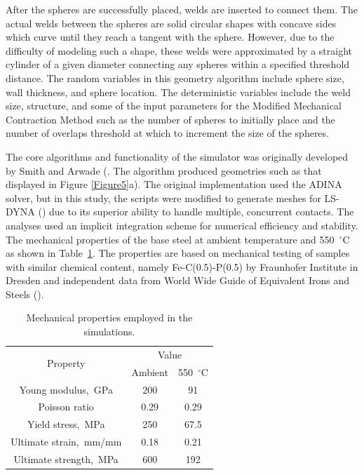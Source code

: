 \documentclass[review]{elsarticle}
\begin{document}
After the spheres are successfully placed, welds are inserted to connect them. The actual welds between the spheres are solid circular shapes with concave sides which curve until they reach a tangent with the sphere. However, due to the difficulty of modeling such a shape, these welds were approximated by a straight cylinder of a given diameter connecting any spheres within a specified threshold distance. The random variables in this geometry algorithm include sphere size, wall thickness, and sphere location. The deterministic variables include the weld size, structure, and some of the input parameters for the Modified Mechanical Contraction Method such as the number of spheres to initially place and the number of overlaps threshold at which to increment the size of the spheres.

The core algorithms and functionality of the simulator was originally developed by Smith and Arwade (\cite{Smith2012,smith_characterization_2012}. The algorithm produced geometries such as that displayed in Figure \ref{Figure5}a). The original implementation used the ADINA solver, but in this study, the scripts were modified to generate meshes for LS-DYNA (\cite{hallquist_ls-dyna_2006}) due to its superior ability to handle multiple, concurrent contacts. The analyses used an implicit integration scheme for numerical efficiency and stability. The mechanical properties of the base steel at ambient temperature and 550~$^\circ\mathrm{C}$ as shown in Table~\ref{Tab2}. The properties are based on mechanical testing of samples with similar chemical content, namely Fe-C(0.5)-P(0.5) by Fraunhofer Institute in Dresden and independent data from World Wide Guide of Equivalent Irons and Steels (\cite{cverna_worldwide_2006}).


\begin{table}[htbp]
	\centering
	\caption{Mechanical properties employed in the simulations.}
	\begin{tabular}{ccc}
		\toprule
		\multirow{2}[0]{*}{Property} & \multicolumn{2}{c}{Value} \\
		& Ambient & 550~$^\circ\mathrm{C}$ \\
		\midrule
		Young modulus,~GPa & 200 & 91 \\
		Poisson ratio & 0.29  & 0.29 \\
		Yield stress,~MPa & 250 & 67.5 \\
		Ultimate strain,~mm/mm & 0.18  & 0.21 \\
		Ultimate strength,~MPa & 600 & 192 \\
		\bottomrule
	\end{tabular}%
	\label{Tab2}%
\end{table}%
\end{document}
